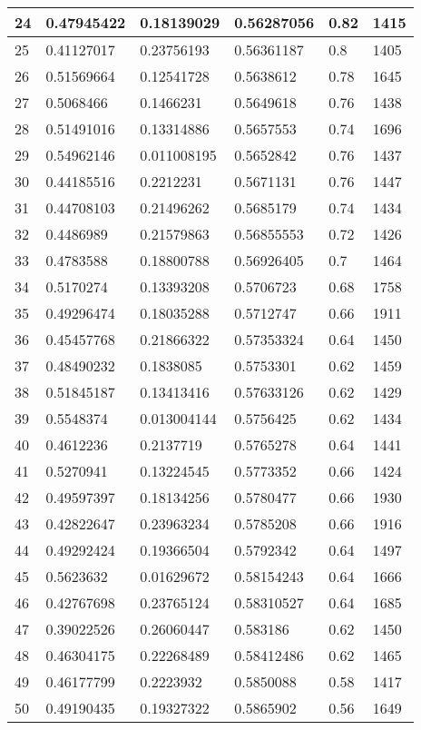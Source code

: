 \begin{longtable}{|l|l|l|l|l|l|}
24 & 0.47945422 & 0.18139029 & 0.56287056 & 0.82 & 1415 \\ \hline 
25 & 0.41127017 & 0.23756193 & 0.56361187 & 0.8 & 1405 \\ \hline 
26 & 0.51569664 & 0.12541728 & 0.5638612 & 0.78 & 1645 \\ \hline 
27 & 0.5068466 & 0.1466231 & 0.5649618 & 0.76 & 1438 \\ \hline 
28 & 0.51491016 & 0.13314886 & 0.5657553 & 0.74 & 1696 \\ \hline 
29 & 0.54962146 & 0.011008195 & 0.5652842 & 0.76 & 1437 \\ \hline 
30 & 0.44185516 & 0.2212231 & 0.5671131 & 0.76 & 1447 \\ \hline 
31 & 0.44708103 & 0.21496262 & 0.5685179 & 0.74 & 1434 \\ \hline 
32 & 0.4486989 & 0.21579863 & 0.56855553 & 0.72 & 1426 \\ \hline 
33 & 0.4783588 & 0.18800788 & 0.56926405 & 0.7 & 1464 \\ \hline 
34 & 0.5170274 & 0.13393208 & 0.5706723 & 0.68 & 1758 \\ \hline 
35 & 0.49296474 & 0.18035288 & 0.5712747 & 0.66 & 1911 \\ \hline 
36 & 0.45457768 & 0.21866322 & 0.57353324 & 0.64 & 1450 \\ \hline 
37 & 0.48490232 & 0.1838085 & 0.5753301 & 0.62 & 1459 \\ \hline 
38 & 0.51845187 & 0.13413416 & 0.57633126 & 0.62 & 1429 \\ \hline 
39 & 0.5548374 & 0.013004144 & 0.5756425 & 0.62 & 1434 \\ \hline 
40 & 0.4612236 & 0.2137719 & 0.5765278 & 0.64 & 1441 \\ \hline 
41 & 0.5270941 & 0.13224545 & 0.5773352 & 0.66 & 1424 \\ \hline 
42 & 0.49597397 & 0.18134256 & 0.5780477 & 0.66 & 1930 \\ \hline 
43 & 0.42822647 & 0.23963234 & 0.5785208 & 0.66 & 1916 \\ \hline 
44 & 0.49292424 & 0.19366504 & 0.5792342 & 0.64 & 1497 \\ \hline 
45 & 0.5623632 & 0.01629672 & 0.58154243 & 0.64 & 1666 \\ \hline 
46 & 0.42767698 & 0.23765124 & 0.58310527 & 0.64 & 1685 \\ \hline 
47 & 0.39022526 & 0.26060447 & 0.583186 & 0.62 & 1450 \\ \hline 
48 & 0.46304175 & 0.22268489 & 0.58412486 & 0.62 & 1465 \\ \hline 
49 & 0.46177799 & 0.2223932 & 0.5850088 & 0.58 & 1417 \\ \hline 
50 & 0.49190435 & 0.19327322 & 0.5865902 & 0.56 & 1649 \\ \hline 
\end{longtable}